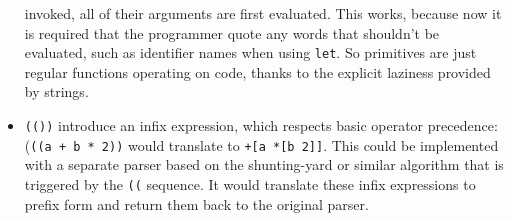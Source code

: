 \begin{itemize}
    invoked, all of their arguments are first evaluated. This works, because
    now it is required that the programmer quote any words that shouldn't be
    evaluated, such as identifier names when using \texttt{let}. So primitives
    are just regular functions operating on code, thanks to the explicit
    laziness provided by strings.
    \item \texttt{(())} introduce an infix expression, which respects basic
    operator precedence: (\texttt{((a + b * 2))} would translate to
    \texttt{+[a *[b 2]]}. This could be implemented with a separate parser
    based on the
    shunting-yard\cite{shunting_yard} or
    similar algorithm that is triggered by the \texttt{((} sequence. It would
    translate these infix expressions to prefix form and return them back to
    the original parser.
\end{itemize}